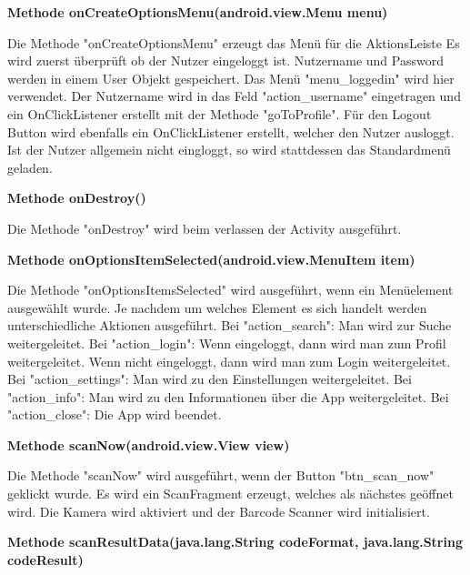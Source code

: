 \documentclass{scrartcl}
\begin{document}
\noindent\textbf{Methode onCreateOptionsMenu(android.view.Menu menu)}

\noindent Die Methode "onCreateOptionsMenu" erzeugt das Menü für die AktionsLeiste Es wird zuerst überprüft ob der Nutzer eingeloggt ist. Nutzername und Password werden in einem User Objekt gespeichert. Das Menü "menu\_loggedin" wird hier verwendet. Der Nutzername wird in das Feld "action\_username" eingetragen und ein OnClickListener erstellt mit der Methode "goToProfile". Für den Logout Button wird ebenfalls ein OnClickListener erstellt, welcher den Nutzer ausloggt. Ist der Nutzer allgemein nicht eingloggt, so wird stattdessen das Standardmenü geladen. \newline

\noindent\textbf{Methode onDestroy()}

\noindent Die Methode "onDestroy" wird beim verlassen der Activity ausgeführt. \newline

\noindent\textbf{Methode onOptionsItemSelected(android.view.MenuItem item)}

\noindent Die Methode "onOptionsItemsSelected" wird ausgeführt, wenn ein Menüelement ausgewählt wurde. Je nachdem um welches Element es sich handelt werden unterschiedliche Aktionen ausgeführt. Bei "action\_search": Man wird zur Suche weitergeleitet. Bei "action\_login": Wenn eingeloggt, dann wird man zum Profil weitergeleitet. Wenn nicht eingeloggt, dann wird man zum Login weitergeleitet. Bei "action\_settings": Man wird zu den Einstellungen weitergeleitet. Bei "action\_info": Man wird zu den Informationen über die App weitergeleitet. Bei "action\_close": Die App wird beendet. \newline

\noindent\textbf{Methode scanNow(android.view.View view)}

\noindent Die Methode "scanNow" wird ausgeführt, wenn der Button "btn\_scan\_now" geklickt wurde. Es wird ein ScanFragment erzeugt, welches als nächstes geöffnet wird. Die Kamera wird aktiviert und der Barcode Scanner wird initialisiert. \newline

\noindent\textbf{Methode scanResultData(java.lang.String codeFormat, java.lang.String codeResult)}
\end{document}
